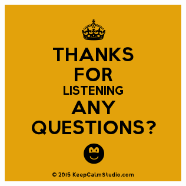 \documentclass[11pt]{beamer}
\begin{document}
\section{}
\begin{frame}{}
\begin{figure}
    \includegraphics[width=.8\textwidth]{last.png}
\end{figure}
\end{frame}
\end{document}
